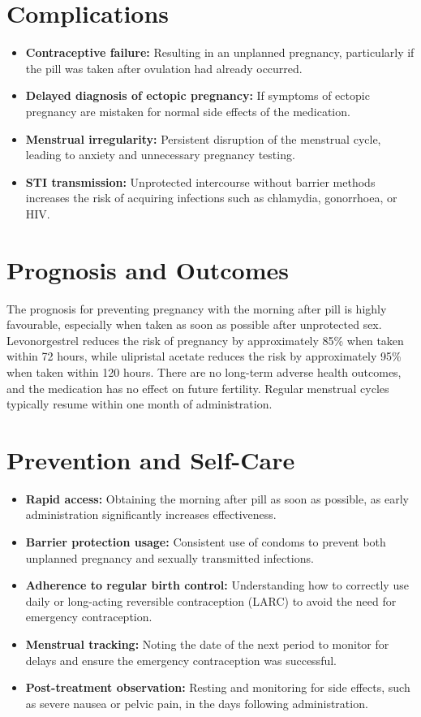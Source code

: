 \section*{Complications}
\begin{itemize}
    \item \textbf{Contraceptive failure:} Resulting in an unplanned pregnancy, particularly if the pill was taken after ovulation had already occurred.
    \item \textbf{Delayed diagnosis of ectopic pregnancy:} If symptoms of ectopic pregnancy are mistaken for normal side effects of the medication.
    \item \textbf{Menstrual irregularity:} Persistent disruption of the menstrual cycle, leading to anxiety and unnecessary pregnancy testing.
    \item \textbf{STI transmission:} Unprotected intercourse without barrier methods increases the risk of acquiring infections such as chlamydia, gonorrhoea, or HIV.
\end{itemize}

\section*{Prognosis and Outcomes}
The prognosis for preventing pregnancy with the morning after pill is highly favourable, especially when taken as soon as possible after unprotected sex. Levonorgestrel reduces the risk of pregnancy by approximately 85\% when taken within 72 hours, while ulipristal acetate reduces the risk by approximately 95\% when taken within 120 hours. There are no long-term adverse health outcomes, and the medication has no effect on future fertility. Regular menstrual cycles typically resume within one month of administration.

\section*{Prevention and Self-Care}
\begin{itemize}
    \item \textbf{Rapid access:} Obtaining the morning after pill as soon as possible, as early administration significantly increases effectiveness.
    \item \textbf{Barrier protection usage:} Consistent use of condoms to prevent both unplanned pregnancy and sexually transmitted infections.
    \item \textbf{Adherence to regular birth control:} Understanding how to correctly use daily or long-acting reversible contraception (LARC) to avoid the need for emergency contraception.
    \item \textbf{Menstrual tracking:} Noting the date of the next period to monitor for delays and ensure the emergency contraception was successful.
    \item \textbf{Post-treatment observation:} Resting and monitoring for side effects, such as severe nausea or pelvic pain, in the days following administration.
\end{itemize}

